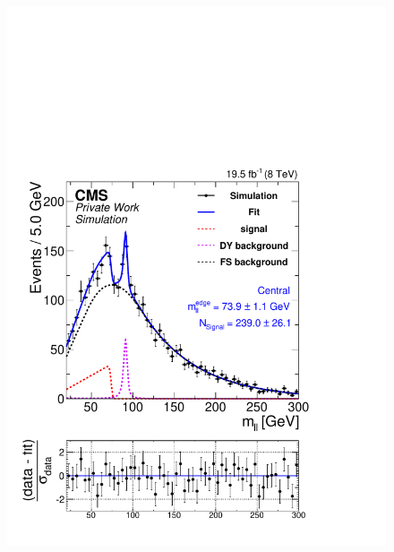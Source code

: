 \begin{figure}[hbp]
\begin{minipage}[t]{0.49\textwidth}
    \includegraphics[width=\textwidth]{plots/results/fit/mcFits/fit2012_ETHTriangle_SignalInclusive_Combined_Full2012_ETHTriangle_MC_SignalInjected_slepton_500_175_100_Central.pdf}
  \end{minipage}
  \begin{minipage}[t]{0.49\textwidth}

\end{minipage}
\end{figure}
